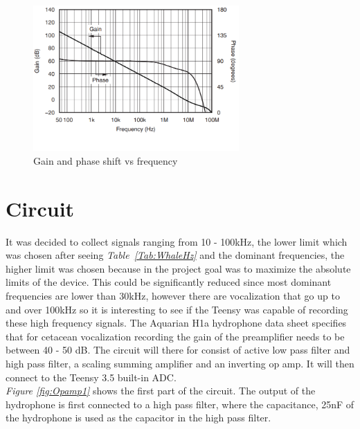 \begin{figure}[h]
    \centering
    \includegraphics[width=0.7\textwidth]{graphics/dbVsfreq.png}
    \caption{Gain and phase shift vs frequency\cite{noauthor_opa164x_nodate}}
    \label{fig:dbvsFreq}
\end{figure}


\vspace{4cm}


\section{Circuit}\label{sec:CircResult}

It was decided to collect signals ranging from 10 - 100kHz, the lower limit which was chosen after seeing \textit{Table~\ref{Tab:WhaleHz}} and the dominant frequencies, the higher limit was chosen because in the project goal was to maximize the absolute limits of the device.
This could be significantly reduced since most dominant frequencies are lower than 30kHz, however there are vocalization that go up to and over 100kHz so it is interesting to see if the Teensy was capable of recording these high frequency signals.
The Aquarian H1a hydrophone data sheet specifies that for cetacean vocalization recording the gain of the preamplifier needs to be between 40 - 50 dB\cite{noauthor_aquarian_nodate}.
The circuit will there for consist of active low pass filter and high pass filter, a scaling summing amplifier and an inverting op amp.
It will then connect to the Teensy 3.5 built-in ADC.\\
\indent \textit{Figure \ref{fig:Opamp1}} shows the first part of the circuit.
The output of the hydrophone is first connected to a high pass filter, where the capacitance, 25nF of the hydrophone is used as the capacitor in the high pass filter.

